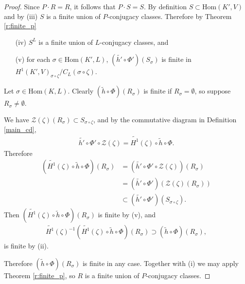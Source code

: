 \begin{proof}
Since $P \cdot R = R$, it follows that $P\cdot S = S$. By definition $S \subset \mathrm{Hom}(K', V)$ and by (iii) $S$ is a finite union of $P$-conjugacy classes. Therefore by Theorem \ref{r:finite_p}
\begin{itemize}
	\item[(iv)] $S^L$ is a finite union of $L$-conjugacy classes, and
	\item[(v)] for each $\sigma \in \mathrm{Hom}(K', L)$, $(\widetilde{h'} \circ \Phi')\left(S_\sigma\right)$ is finite in $H^1(K', V)_{\sigma\circ\zeta}/C_L(\sigma\circ\zeta)$.
\end{itemize}

Let $\sigma \in \mathrm{Hom}(K, L)$. Clearly $(\widetilde{h} \circ \Phi)\left(R_\sigma\right)$ is finite if $R_\sigma = \emptyset$, so suppose $R_\sigma \neq \emptyset$. 

We have $\mathcal{Z}(\zeta)(R_\sigma) \subset S_{\sigma\circ\zeta}$, and by the commutative diagram in Definition \ref{main_cd},
\begin{align*}
	\widetilde{h'} \circ \Phi' \circ \mathcal{Z}(\zeta) = \widetilde{H^1}(\zeta) \circ \widetilde{h} \circ \Phi.
\end{align*}
Therefore
\begin{align*}
	\left(\widetilde{H^1}(\zeta) \circ \widetilde{h} \circ \Phi\right)(R_\sigma) &= \left(\widetilde{h'} \circ \Phi' \circ \mathcal{Z}(\zeta)\right)(R_\sigma) \\
		&= (\widetilde{h'} \circ \Phi')\left(\mathcal{Z}(\zeta)(R_\sigma)\right) \\
		&\subset (\widetilde{h'} \circ \Phi')(S_{\sigma\circ\zeta}).
\end{align*}
Then $\left(\widetilde{H^1}(\zeta) \circ \widetilde{h} \circ \Phi\right)(R_\sigma)$ is finite by (v), and
\begin{align*}
	\widetilde{H^1}(\zeta)^{-1} \left(\widetilde{H^1}(\zeta) \circ \widetilde{h} \circ \Phi\right)(R_\sigma) \supset (\widetilde{h} \circ \Phi)(R_\sigma),
\end{align*}
is finite by (ii).

Therefore $(\widetilde{h} \circ \Phi)(R_\sigma)$ is finite in any case. Together with (i) we may apply Theorem \ref{r:finite_p}, so $R$ is a finite union of $P$-conjugacy classes.
\end{proof}

